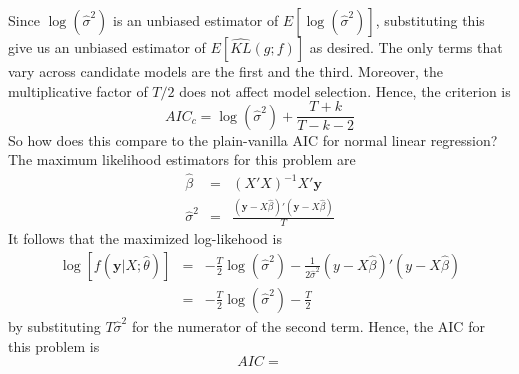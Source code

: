 \documentclass[12pt]{article}
\theoremstyle{definition}
\begin{document}
Since $\log(\widehat{\sigma}^2)$ is an unbiased estimator of $E[\log(\widehat{\sigma}^2)]$, substituting this give us an unbiased estimator of $E\left[\widehat{KL}(g;f) \right]$ as desired. 
The only terms that vary across candidate models are the first and the third. Moreover, the multiplicative factor of $T/2$ does not affect model selection. Hence, the criterion is
	$$AIC_c = \log(\widehat{\sigma}^2) + \frac{T + k}{T - k -2}$$
So how does this compare to the plain-vanilla AIC for normal linear regression? The maximum likelihood estimators for this problem are
\begin{eqnarray*}
	\widehat{\beta} &=& (X'X)^{-1}X'\mathbf{y}\\
	\widehat{\sigma}^2 &=& \frac{(\mathbf{y} - X\widehat{\beta})'(\mathbf{y} - X\widehat{\beta})}{T}
\end{eqnarray*}
It follows that the maximized log-likehood is
\begin{eqnarray*}
	\log\left[f(\mathbf{y}|X;\widehat{\theta})\right] &=&  -\frac{T}{2} \log(\widehat{\sigma}^2) - \frac{1}{2\widehat{\sigma}^2}(y - X\widehat{\beta})'(y -X\widehat{\beta})\\
		&=& -\frac{T}{2} \log(\widehat{\sigma}^2) - \frac{T}{2}
\end{eqnarray*}
by substituting $T\widehat{\sigma}^2$ for the numerator of the second term. Hence, the AIC for this problem is 
	$$AIC = $$
\end{document}
